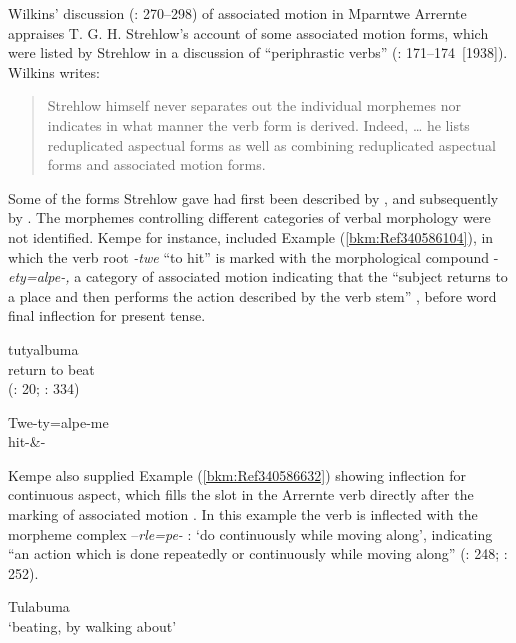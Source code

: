 Wilkins' discussion (\citeyear{wilkins_mparntwe_1989}: 270--298) of associated motion in Mparntwe Arrernte appraises T. G. H. Strehlow’s account of some associated motion forms, which were listed by Strehlow in a discussion of “periphrastic verbs” (\citeyear{strehlow_aranda_1944}: 171--174~[1938]). Wilkins writes:

\begin{quote}
Strehlow himself never separates out the individual morphemes nor indicates in what manner the verb form is derived. Indeed, … he lists reduplicated aspectual forms as well as combining reduplicated aspectual forms and associated motion forms. \citep[273--274]{wilkins_mparntwe_1989}
\end{quote}

Some of the forms Strehlow gave had first been described by \citet[19--22]{kempe_grammar_1891}, and subsequently by \citet[334]{mathews_languages_1907}. The morphemes controlling different categories of verbal morphology were not identified. Kempe for instance, included Example (\ref{bkm:Ref340586104}), in which the verb root \textit{-twe} “to hit” is marked with the morphological compound -\textit{ety=alpe-,} a category of associated motion indicating that the “subject returns to a place and then performs the action described by the verb stem” \citep[241]{henderson_topics_2013}, before word final inflection for present tense.

\newpage
\ea
   \label{bkm:Ref340586104}tutyalbuma\\
return to beat\\

(\citealt{kempe_grammar_1891}: 20; \citealt{mathews_languages_1907}: 334)

\gll Twe-ty=alpe-me\\
hit-\&-\\
\z

Kempe also supplied Example (\ref{bkm:Ref340586632}) showing inflection for continuous aspect, which fills the slot in the Arrernte verb directly after the marking of associated motion \citep[276]{henderson_topics_2013}. In this example the verb is inflected with the morpheme complex –\textit{rle=pe-} : `do continuously while moving along', indicating “an action which is done repeatedly or continuously while moving along” (\citealt{henderson_topics_2013}: 248; \citealt{wilkins_mparntwe_1989}: 252).

\ea
            \label{bkm:Ref340586632}Tulabuma\\
\glt `beating, by walking about'


